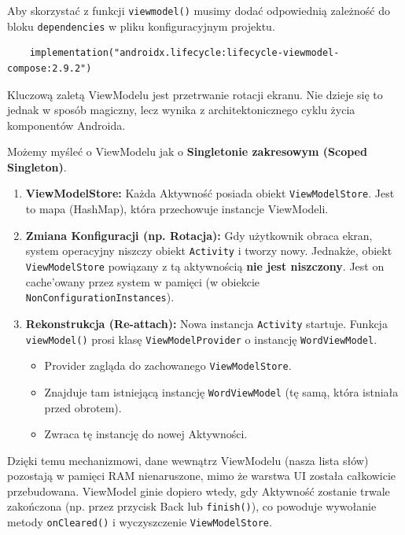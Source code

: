 Aby skorzystać z funkcji \texttt{viewmodel()} musimy dodać odpowiednią zależność do bloku \texttt{dependencies} w pliku konfiguracyjnym projektu.

\begin{verbatim}
    implementation("androidx.lifecycle:lifecycle-viewmodel-compose:2.9.2")
\end{verbatim}

Kluczową zaletą ViewModelu jest przetrwanie rotacji ekranu. Nie dzieje się to jednak w sposób magiczny, lecz wynika z architektonicznego cyklu życia komponentów Androida.

Możemy myśleć o ViewModelu jak o \textbf{Singletonie zakresowym (Scoped Singleton)}.

\begin{enumerate}
    \item \textbf{ViewModelStore:} Każda Aktywność posiada obiekt \texttt{ViewModelStore}. Jest to mapa (HashMap), która przechowuje instancje ViewModeli.
    
    \item \textbf{Zmiana Konfiguracji (np. Rotacja):} 
    Gdy użytkownik obraca ekran, system operacyjny niszczy obiekt \texttt{Activity} i tworzy nowy. Jednakże, obiekt \texttt{ViewModelStore} powiązany z tą aktywnością \textbf{nie jest niszczony}. Jest on cache'owany przez system w pamięci (w obiekcie \texttt{NonConfigurationInstances}).
    
    \item \textbf{Rekonstrukcja (Re-attach):}
    Nowa instancja \texttt{Activity} startuje. Funkcja \texttt{viewModel()} prosi klasę \texttt{ViewModelProvider} o instancję \texttt{WordViewModel}.
    \begin{itemize}
        \item Provider zagląda do zachowanego \texttt{ViewModelStore}.
        \item Znajduje tam istniejącą instancję \texttt{WordViewModel} (tę samą, która istniała przed obrotem).
        \item Zwraca tę instancję do nowej Aktywności.
    \end{itemize}
\end{enumerate}

Dzięki temu mechanizmowi, dane wewnątrz ViewModelu (nasza lista słów) pozostają w pamięci RAM nienaruszone, mimo że warstwa UI została całkowicie przebudowana. ViewModel ginie dopiero wtedy, gdy Aktywność zostanie trwale zakończona (np. przez przycisk Back lub \texttt{finish()}), co powoduje wywołanie metody \texttt{onCleared()} i wyczyszczenie \texttt{ViewModelStore}.

